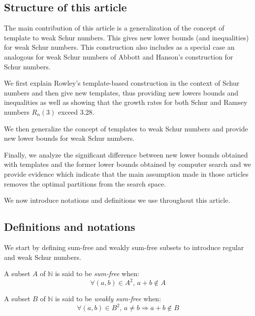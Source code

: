 \subsection{Structure of this article}

\par
The main contribution of this article is a generalization of the concept of template to weak Schur numbers. 
This gives new lower bounds (and inequalities) for weak Schur numbers. This construction also includes as a 
special case an analogous for weak Schur numbers of Abbott and Hanson's construction for Schur numbers.

\par
We first explain Rowley's template-based construction in the context of Schur numbers and then give 
new templates, thus providing new lowers bounds and inequalities as well as showing that the growth rates 
for both Schur and Ramsey numbers \(R_n(3)\) exceed 3.28. 

\par
We then  generalize the concept of templates to weak Schur numbers and provide new lower bounds for weak 
Schur numbers. 

\par
Finally, we analyze the significant difference between new lower bounds obtained with templates and the former 
lower bounds obtained by computer search and we provide evidence which indicate that the main assumption 
made in those articles removes the optimal partitions from the search space.

\par
We now introduce notations and definitions we use throughout this article.

\subsection{Definitions and notations}

We start by defining sum-free and weakly sum-free subsets to introduce regular and weak Schur numbers.

\begin{definition}
A subset \(A\) of \(\mathbb{N}\) is said to be \textit{sum-free} when:
\[ \forall (a,b) \in A^2 \text{, } a+b \notin A\]
\end{definition}

\begin{definition}
A subset \(B\) of \(\mathbb{N}\) is said to be \textit{weakly sum-free} when:
\[ \forall (a,b) \in B^2 \text{, } a \neq b \Longrightarrow a+b \notin B\]
\end{definition}

